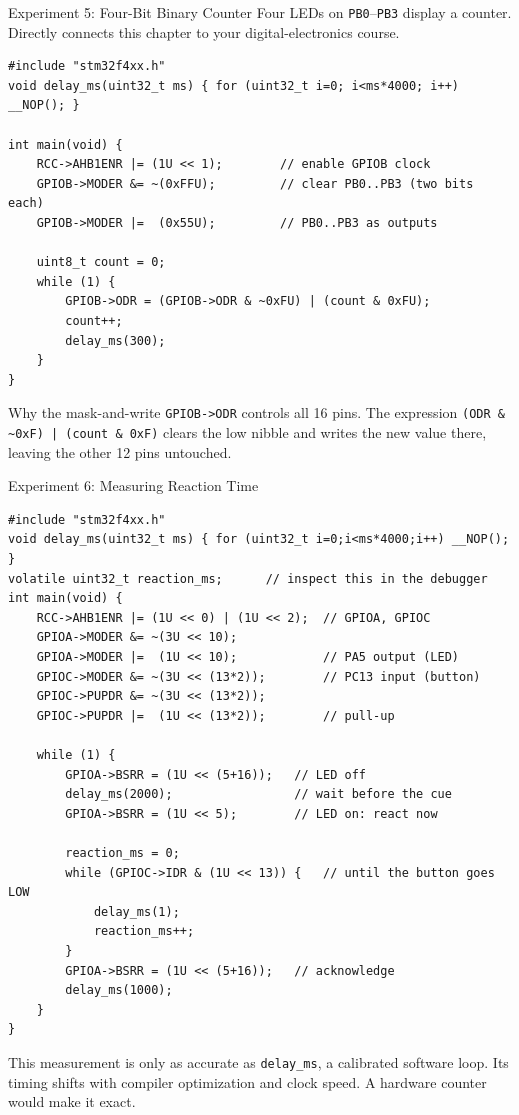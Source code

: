 \documentclass[9pt,aspectratio=169,xcolor=table]{beamer}
\begin{document}
\begin{frame}[fragile]{Experiment 5: Four-Bit Binary Counter}
    \leavevmode
    {\small Four LEDs on \texttt{PB0}--\texttt{PB3} display a counter.
    Directly connects this chapter to your digital-electronics course.}

    \vspace{2mm}
\begin{lstlisting}[style=myc, basicstyle=\ttfamily\scriptsize]
#include "stm32f4xx.h"
void delay_ms(uint32_t ms) { for (uint32_t i=0; i<ms*4000; i++) __NOP(); }

int main(void) {
    RCC->AHB1ENR |= (1U << 1);        // enable GPIOB clock
    GPIOB->MODER &= ~(0xFFU);         // clear PB0..PB3 (two bits each)
    GPIOB->MODER |=  (0x55U);         // PB0..PB3 as outputs

    uint8_t count = 0;
    while (1) {
        GPIOB->ODR = (GPIOB->ODR & ~0xFU) | (count & 0xFU);
        count++;
        delay_ms(300);
    }
}
\end{lstlisting}

    \vspace{2mm}
    \begin{block}{Why the mask-and-write}
        \texttt{GPIOB->ODR} controls all 16 pins. The expression
        \texttt{(ODR \& \textasciitilde 0xF) | (count \& 0xF)} clears
        the low nibble and writes the new value there, leaving the
        other 12 pins untouched.
    \end{block}
\end{frame}

\begin{frame}[fragile]{Experiment 6: Measuring Reaction Time}
	\begin{lstlisting}[style=myc, basicstyle=\ttfamily\scriptsize]
#include "stm32f4xx.h"
void delay_ms(uint32_t ms) { for (uint32_t i=0;i<ms*4000;i++) __NOP(); }
volatile uint32_t reaction_ms;      // inspect this in the debugger
int main(void) {
	RCC->AHB1ENR |= (1U << 0) | (1U << 2);  // GPIOA, GPIOC
	GPIOA->MODER &= ~(3U << 10);
	GPIOA->MODER |=  (1U << 10);            // PA5 output (LED)
	GPIOC->MODER &= ~(3U << (13*2));        // PC13 input (button)
	GPIOC->PUPDR &= ~(3U << (13*2));
	GPIOC->PUPDR |=  (1U << (13*2));        // pull-up

	while (1) {
		GPIOA->BSRR = (1U << (5+16));   // LED off
		delay_ms(2000);                 // wait before the cue
		GPIOA->BSRR = (1U << 5);        // LED on: react now

		reaction_ms = 0;
		while (GPIOC->IDR & (1U << 13)) {   // until the button goes LOW
			delay_ms(1);
			reaction_ms++;
		}
		GPIOA->BSRR = (1U << (5+16));   // acknowledge
		delay_ms(1000);
	}
}
	\end{lstlisting}

	{\small This measurement is only as accurate as \texttt{delay\_ms},
		a calibrated software loop. Its timing shifts with compiler
		optimization and clock speed. \alert{A hardware counter would make it
			exact.}}
\end{frame}
\end{document}
